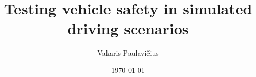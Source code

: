 \documentclass[11pt]{informatics-report}
\title{Testing vehicle safety in simulated driving scenarios}
\author{Vakaris Paulavičius}
\date{\today}
\begin{document}
\createFrontMatter

\onehalfspacing
\tableofcontents
\doublespacing

















\appendix




\end{document}
